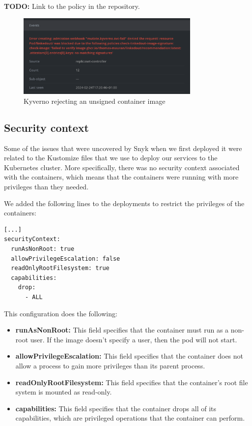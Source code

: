 \documentclass[12pt,x11names]{article}
\begin{document}
\textbf{TODO:} Link to the policy in the repository.

\begin{figure}[H]
  \centering
  \includegraphics[width=0.8\textwidth]{imgs/kyverno_signature_rejection.png}
  \caption{Kyverno rejecting an unsigned container image}
\end{figure}

\subsection{Security context}

Some of the issues that were uncovered by Snyk when we first deployed it were related to
the Kustomize files that we use to deploy our services to the Kubernetes cluster. More
specifically, there was no security context associated with the containers, which means
that the containers were running with more privileges than they needed.

\medskip
We added the following lines to the deployments to restrict the privileges of the containers:

\begin{lstlisting}
[...]
securityContext:
  runAsNonRoot: true
  allowPrivilegeEscalation: false
  readOnlyRootFilesystem: true
  capabilities:
    drop:
      - ALL
\end{lstlisting}

This configuration does the following:

\begin{itemize}
  \item \textbf{runAsNonRoot:} This field specifies that the container must run as a
  non-root user. If the image doesn't specify a user, then the pod will not start.
  \item \textbf{allowPrivilegeEscalation:} This field specifies that the container
  does not allow a process to gain more privileges than its parent process.
  \item \textbf{readOnlyRootFilesystem:} This field specifies that the container's root
  file system is mounted as read-only.
  \item \textbf{capabilities:} This field specifies that the container drops all of its
  capabilities, which are privileged operations that the container can perform.
\end{itemize}
\end{document}
